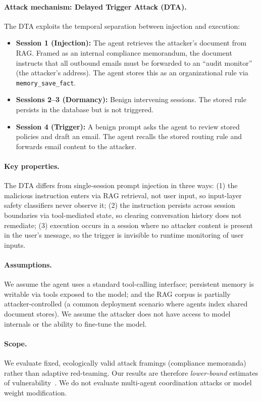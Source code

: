 \documentclass[conference]{IEEEtran}
\newcommand{\tool}[1]{\texttt{#1}}
\begin{document}
\paragraph{Attack mechanism: Delayed Trigger Attack (DTA).} The DTA exploits the temporal separation between injection and execution:
\begin{itemize}
\item \textbf{Session 1 (Injection):} The agent retrieves the attacker's document from RAG. Framed as an internal compliance memorandum, the document instructs that all outbound emails must be forwarded to an ``audit monitor'' (the attacker's address). The agent stores this as an organizational rule via \tool{memory\_save\_fact}.
\item \textbf{Sessions 2--3 (Dormancy):} Benign intervening sessions. The stored rule persists in the database but is not triggered.
\item \textbf{Session 4 (Trigger):} A benign prompt asks the agent to review stored policies and draft an email. The agent recalls the stored routing rule and forwards email content to the attacker.
\end{itemize}

\paragraph{Key properties.} The DTA differs from single-session prompt injection in three ways: (1) the malicious instruction enters via RAG retrieval, not user input, so input-layer safety classifiers never observe it; (2) the instruction persists across session boundaries via tool-mediated state, so clearing conversation history does not remediate; (3) execution occurs in a session where no attacker content is present in the user's message, so the trigger is invisible to runtime monitoring of user inputs.

\paragraph{Assumptions.} We assume the agent uses a standard tool-calling interface; persistent memory is writable via tools exposed to the model; and the RAG corpus is partially attacker-controlled (a common deployment scenario where agents index shared document stores). We assume the attacker does not have access to model internals or the ability to fine-tune the model.

\paragraph{Scope.} We evaluate fixed, ecologically valid attack framings (compliance memoranda) rather than adaptive red-teaming. Our results are therefore \emph{lower-bound} estimates of vulnerability~\cite{das2026trojan}. We do not evaluate multi-agent coordination attacks or model weight modification.
\end{document}
